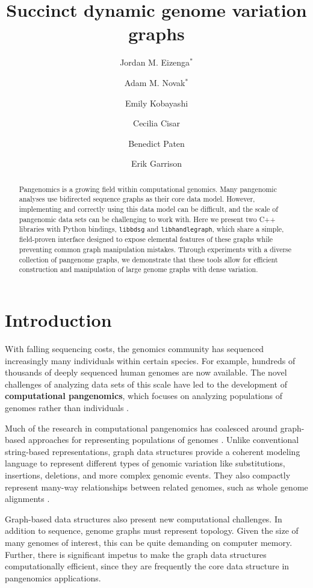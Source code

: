 \documentclass{article}
\title{Succinct dynamic genome variation graphs} %
\author{Jordan M. Eizenga$^*$ \and Adam M. Novak$^*$ \and Emily Kobayashi \and Cecilia Cisar \and Benedict Paten \and Erik Garrison}
\newcommand{\vocab}{\textbf}
\begin{document}
\maketitle

\begin{abstract}

Pangenomics is a growing field within computational genomics.
Many pangenomic analyses use bidirected sequence graphs as their core data model.
However, implementing and correctly using this data model can be difficult, and the scale of pangenomic data sets can be challenging to work with.
Here we present two C++ libraries with Python bindings, \texttt{libbdsg} and \texttt{libhandlegraph}, which share a simple, field-proven interface designed to expose elemental features of these graphs while preventing common graph manipulation mistakes.
Through experiments with a diverse collection of pangenome graphs, we demonstrate that these tools allow for efficient construction and manipulation of large genome graphs with dense variation.

\end{abstract}

\section{Introduction}


With falling sequencing costs, the genomics community has sequenced increasingly many individuals within certain species.
For example, hundreds of thousands of deeply sequenced human genomes are now available.
The novel challenges of analyzing data sets of this scale have led to the development of \vocab{computational pangenomics}, which focuses on analyzing populations of genomes rather than individuals \cite{computational2016computational}.

Much of the research in computational pangenomics has coalesced around graph-based approaches for representing populations of genomes \cite{Paten_2017}.
Unlike conventional string-based representations, graph data structures provide a coherent modeling language to represent different types of genomic variation like substitutions, insertions, deletions, and more complex genomic events.
They also compactly represent many-way relationships between related genomes, such as whole genome alignments \cite{kehr2014genome}.

Graph-based data structures also present new computational challenges.
In addition to sequence, genome graphs must represent topology.
Given the size of many genomes of interest, this can be quite demanding on computer memory.
Further, there is significant impetus to make the graph data structures computationally efficient, since they are frequently the core data structure in pangenomics applications.
\end{document}
